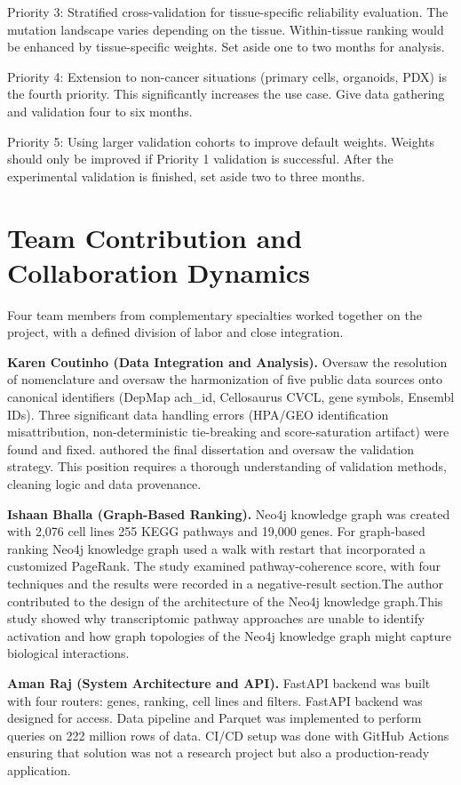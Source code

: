 \documentclass[author={Karen Coutinho, Ishaan Bhalla, Aman Raj, Dixit Kaloorani Malarmannan},
                supervisor={Dr. Daniel D'Andrea},
                degree={MSc},
                title={CellSelector Omics: A Multi-Omics Recommendation System for Cell Line Selection},
                subtitle={},
                type={},
                year={2026}]{dissertation}
\begin{document}
Priority 3: Stratified cross-validation for tissue-specific reliability evaluation. The mutation landscape varies depending on the tissue. Within-tissue ranking would be enhanced by tissue-specific weights. Set aside one to two months for analysis.

Priority 4: Extension to non-cancer situations (primary cells, organoids, PDX) is the fourth priority. This significantly increases the use case. Give data gathering and validation four to six months.

Priority 5: Using larger validation cohorts to improve default weights. Weights should only be improved if Priority 1 validation is successful. After the experimental validation is finished, set aside two to three months.

\section{Team Contribution and Collaboration Dynamics}

Four team members from complementary specialties worked together on the project, with a defined division of labor and close integration.

{\bf Karen Coutinho (Data Integration and Analysis).} Oversaw the resolution of nomenclature and oversaw the harmonization of five public data sources onto canonical identifiers (DepMap ach\_id, Cellosaurus CVCL, gene symbols, Ensembl IDs). Three significant data handling errors (HPA/GEO identification misattribution, non-deterministic tie-breaking and score-saturation artifact) were found and fixed. authored the final dissertation and oversaw the validation strategy. This position requires a thorough understanding of validation methods, cleaning logic and data provenance.

{\bf Ishaan Bhalla (Graph-Based Ranking).} Neo4j knowledge graph was created with 2,076 cell lines 255 KEGG pathways and 19,000 genes. For graph‑based ranking Neo4j knowledge graph used a walk with restart that incorporated a customized PageRank. The study examined pathway‑coherence score, with four techniques and the results were recorded in a negative‑result section.The author contributed to the design of the architecture of the Neo4j knowledge graph.This study showed why transcriptomic pathway approaches are unable to identify activation and how graph topologies of the Neo4j knowledge graph might capture biological interactions.

{\bf Aman Raj (System Architecture and API).} FastAPI backend was built with four routers: genes, ranking, cell lines and filters. FastAPI backend was designed for access. Data pipeline and Parquet was implemented to perform queries on 222 million rows of data. CI/CD setup was done with GitHub Actions ensuring that solution was not a research project but also a production-ready application.
\end{document}
